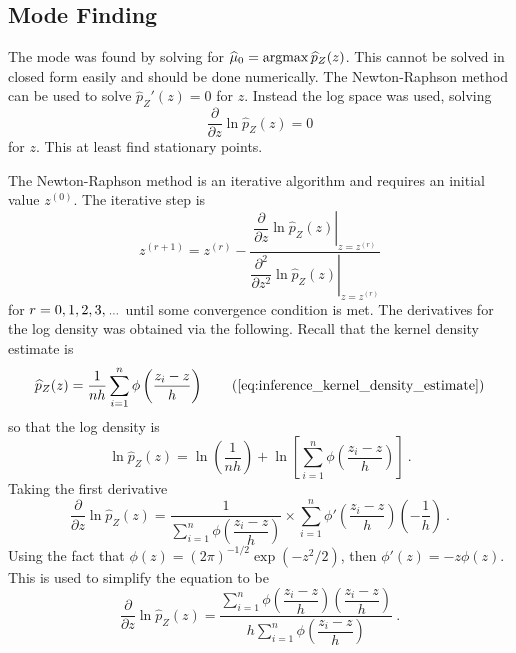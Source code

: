 \subsection{Mode Finding}

The mode was found by solving for $\widehat{\mu}_0 = \operatorname*{argmax}\widehat{p}_Z(z)$. This cannot be solved in closed form easily and should be done numerically. The  Newton-Raphson method can be used to solve $\hat{p}_Z'(z) = 0$ for $z$. Instead the log space was used, solving
\begin{equation}
	\dfrac{
		\partial
	}
	{
		\partial z
	}
	\ln\widehat{p}_Z(z)
	= 0
\end{equation}
for $z$. This at least find stationary points.

The Newton-Raphson method is an iterative algorithm and requires an initial value $z^{(0)}$. The iterative step is
\begin{equation}
	z^{(r+1)} =
	z^{(r)}
	-\dfrac{
		\left.
			\dfrac{
				\partial
			}
			{
				\partial z
			}
			\ln\widehat{p}_Z(z)
		\right|_{z = z^{(r)}}
	}
	{
		\left.
			\dfrac{
				\partial^2
			}
			{
				\partial z^2
			}
			\ln\widehat{p}_Z(z)
		\right|_{z = z^{(r)}}
	} 
\end{equation}
for $r=0,1,2,3,\dotdotdot$ until some convergence condition is met. The derivatives for the log density was obtained via the following. Recall that the kernel density estimate is
\begin{equation}
	\widehat{p}_Z(z)=
	\frac{1}{nh}
	\sum_{i=1}^n\phi\left(
		\dfrac{z_i-z}{h}
	\right)
	\tag{\ref{eq:inference_kernel_density_estimate}}
\end{equation}
so that the log density is
\begin{equation}
	\ln\widehat{p}_Z(z)=
	\ln\left(
		\dfrac{1}{nh}
	\right)
	+
	\ln\left[
		\sum_{i=1}^n
		\phi\left(
			\dfrac{
				z_i - z
			}
			{
				h
			}
		\right)
	\right]
	\ .
\end{equation}
Taking the first derivative
\begin{equation}
	\dfrac{
		\partial
	}
	{
		\partial z
	}
	\ln\widehat{p}_Z(z)
	=
	\dfrac{
		1
	}
	{
		\sum_{i=1}^n
		\phi\left(
			\dfrac{
				z_i - z
			}
			{
				h
			}
		\right)
	}
	\times
	\sum_{i=1}^n
	\phi'\left(
		\dfrac{
			z_i - z
		}
		{
			h
		}
	\right)
	\left(
		-\dfrac{
			1
		}
		{
			h
		}
	\right)
	\ .
\end{equation}
Using the fact that $\phi(z)=(2\pi)^{-1/2}\exp(-z^2/2)$, then $\phi'(z)=-z\phi(z)$. This is used to simplify the equation to be
\begin{equation}
	\dfrac{
		\partial
	}
	{
		\partial z
	}
	\ln\widehat{p}_Z(z)
	=
	\dfrac{
		\sum_{i=1}^n
		\phi\left(
			\dfrac{
				z_i - z
			}
			{
				h
			}
		\right)
		\left(
			\dfrac{
				z_i - z
			}
			{
				h
			}
		\right)
	}
	{
		h
		\sum_{i=1}^n
		\phi\left(
			\dfrac{
				z_i - z
			}
			{
				h
			}
		\right)
	}
	\ .
\end{equation}
